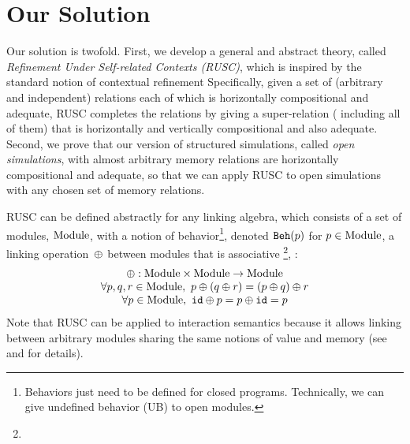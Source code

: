 \section{Our Solution}
\label{sec:rusc:solution}

Our solution is twofold. First, we develop a general and abstract
theory, called \emph{Refinement Under Self-related Contexts (RUSC)},
which is inspired by the standard notion of contextual refinement
Specifically, given a set of (arbitrary and independent)
relations each of which is horizontally compositional and adequate,
RUSC completes the relations by giving a super-relation (\ie
including all of them) that is horizontally and vertically
compositional and also adequate. Second, we prove that
our version of structured simulations, called \emph{open simulations},
with almost arbitrary memory relations
are horizontally compositional and adequate,
so that we can apply RUSC to open simulations with any chosen set of memory relations.

%
RUSC can be defined abstractly for any linking algebra, which consists
of a set of modules, $\textrm{Module}$, with a notion of behavior\footnote{Behaviors just need to be defined for closed programs.
  Technically, we can give undefined behavior (UB) to open modules.
}, denoted
$\mathtt{Beh}({p})$ for $p\in\textrm{Module}$, a linking operation~$\oplus$ between modules
that is associative%
\footnote{},
:
\[
\begin{array}{c}
\oplus: \textrm{Module} \times \textrm{Module} \rightarrow \textrm{Module} \\
\forall p,q,r\in\textrm{Module},~p \oplus (q \oplus r) = (p \oplus q) \oplus r \\
\forall p \in\textrm{Module},~ \texttt{id} \oplus p = p \oplus \texttt{id} = p \\
\end{array}
\]
Note that RUSC can be applied to interaction semantics because it
allows linking between arbitrary modules sharing the same notions
of value and memory (see  and  for details).

